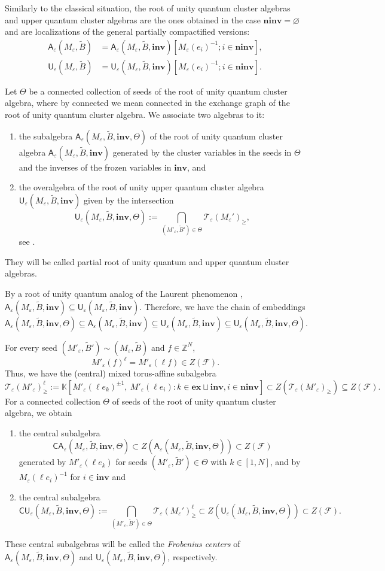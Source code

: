 \documentclass[11pt]{amsart}
\theoremstyle{plain}
\def \KK {{\mathbb C}}
\def \KK {{\mathbb K}}
\def \Zset {{\mathbb Z}}
\def \A {{\boldsymbol{\mathsf A}}}
\def \C {{\boldsymbol{\mathsf C}}}
\def \U {{\boldsymbol{\mathsf U}}}
\def \B  {{\widetilde{B}}}
\newcommand \ex {{\mathbf{ex}}}
\newcommand \inv {{\mathbf{inv}}}
\newcommand \ninv {{\mathbf{ninv}}}
\def \TT {{\mathcal{T}}}
\def \FF {{\mathcal{F}}}
\def \ep {\varepsilon}
\begin{document}
Similarly to the classical situation, the root of unity quantum cluster algebras and upper quantum cluster algebras are the ones obtained in the case $\ninv = \varnothing$ and are localizations of the general partially compactified versions:
\begin{align*}
\A_\ep(M_\ep,\B) &=
\A_\ep(M_\ep, \B,\inv)[M_\ep(e_i)^{-1}; i \in \ninv],
\\
\U_\ep(M_\ep,\B) &=
\U_\ep(M_\ep,\B, \inv)[M_\ep(e_i)^{-1}; i \in \ninv].
\end{align*}

Let $\Theta$ be a connected collection of seeds of the root of unity quantum cluster algebra,
where by connected we mean connected in the exchange graph of the root of unity quantum cluster algebra. We associate two algebras to it:
\begin{enumerate}
\item the subalgebra $\A_\ep(M_\ep,\B,\inv, \Theta)$  of the root of unity quantum cluster algebra $\A_\ep(M_\ep,\B,\inv)$ generated by the cluster variables in the seeds in $\Theta$ and the inverses of the frozen variables in $\inv$, and 
\item the overalgebra of the root of unity upper quantum cluster algebra $\U_\ep(M_\ep,\B,\inv)$ given by the intersection
\[
\U_\ep(M_\ep, \B, \inv, \Theta) := \bigcap_{ (M'_\ep, \B') \in \Theta}\TT_\ep(M_\ep')_{\geq},
\]
see \cite[Sect. 3.2]{HLY}. 
\end{enumerate}
They will be called partial root of unity quantum and upper quantum cluster algebras.

By a root of unity quantum analog of the Laurent phenomenon \cite[Theorem 3.10]{NTY2}, $\A_\ep(M_\ep, \B, \inv)\subseteq \U_\ep(M_\ep,  \B, \inv)$. Therefore, we have the chain of embeddings
\[
\A_\ep(M_\ep,\B,\inv, \Theta) \subseteq \A_\ep(M_\ep,\B,\inv) \subseteq \U_\ep(M_\ep,\B,\inv) \subseteq \U_\ep(M_\ep,\B,\inv, \Theta). 
\]

For every seed $(M'_\ep, \B') \sim (M_\ep, \B)$ and $f \in \Zset^N$,
\[
M'_\ep(f)^\ell = 
M'_\ep(\ell f) \in Z(\FF). 
\] 
Thus, we have the (central) mixed torus-affine subalgebra
\[
\TT_\ep( M'_\ep)_{\geq}^\ell:= \KK [ M'_\ep(\ell e_k)^{\pm 1}, \ M'_\ep(\ell e_i)   : 
k \in \ex \sqcup \inv,  i \in \ninv ] \subset Z( \TT_\ep(M'_\ep)_\geq)
\subseteq Z(\FF).
\]
For a connected collection $\Theta$ of seeds of the root of unity quantum cluster algebra, we obtain 
\begin{enumerate}
\item 
the central subalgebra
\[
\C\A_\ep(M_\ep, \B, \inv, \Theta)
\subset Z (\A_\ep(M_\ep, \B, \inv, \Theta))
\subset Z(\FF)
\]
generated by $M'_\ep(\ell e_k)$ for seeds 
$(M'_\ep, \B') \in \Theta$ with $k \in [1,N]$, and by $M_\ep(\ell e_i)^{-1}$ for $i \in \inv$ 
and 
\item 
the central subalgebra  
\[
\C\U_\ep(M_\ep, \B, \inv, \Theta) := \bigcap_{ (M'_\ep, \B') \in \Theta} \TT_\ep(M_\ep')_{\geq}^\ell
\subset Z (\U_\ep(M_\ep, \B, \inv, \Theta)) 
\subset Z(\FF).
\]
\end{enumerate}
These central subalgebras will be called the {\em{Frobenius centers}} of $\A_\ep(M_\ep, \B, \inv, \Theta)$ and 
$\U_\ep(M_\ep, \B, \inv, \Theta)$, respectively. 
\end{document}
